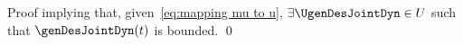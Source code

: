 \begin{custumProof}{Proof}
	implying that, given~\cref{eq:mapping mu to u},  $\exists\UgenDesJointDyn\in U$ such that $\genDesJointDyn(t)$ is bounded. %
	\qed\end{custumProof}

